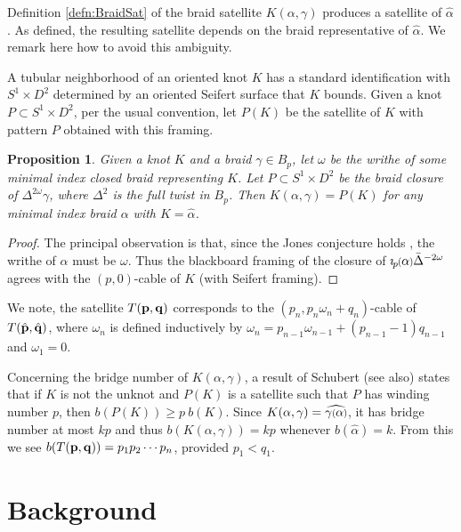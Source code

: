 \documentclass[11pt]{amsart}
\newcommand*{\smallp}[1]{\scalebox{.75}{\ensuremath#1}}
\newcommand{\pp}[2][p]{\imath_{\hspace*{-1pt}#1}\hspace*{-.5pt}\smallp(#2\smallp)}
\newtheorem{prop}[thm]{Proposition}
\theoremstyle{definition}
\begin{document}
Definition \ref{defn:BraidSat} of the braid satellite $K(\alpha,\gamma)$ produces a satellite of $\hat{\alpha}$. As defined, the resulting satellite depends on the braid representative of $\hat{\alpha}$. We remark here how to avoid this ambiguity.

A tubular neighborhood of an oriented knot $K$ has a standard identification with $S^1\times D^2$ determined by an oriented Seifert surface that $K$ bounds. Given a knot $P\subset S^1\times D^2$, per the usual convention, let $P(K)$ be the satellite of $K$ with pattern $P$ obtained with this framing.

\begin{prop}\label{PropAsSatelliteOp}Given a knot $K$ and a braid $\gamma\in B_p$, let $\omega$ be the writhe of some minimal index closed braid representing $K$. Let $P\subset S^1\times D^2$ be the braid closure of $\Delta^{2\omega}\gamma$, where $\Delta^2$ is the full twist in $B_p$. Then $K(\alpha,\gamma) = P(K)$ for any minimal index braid $\alpha$ with $K=\hat{\alpha}$.
\end{prop}
\begin{proof}The principal observation is that, since the Jones conjecture holds \cite{DP12,LM12}, the writhe of $\alpha$ must be $\omega$. Thus the blackboard framing of the closure of $\pp\alpha\bar\Delta^{-2\omega}$ agrees with the $(p,0)$-cable of $K$ (with Seifert framing).
\end{proof}

We note, the satellite $T({\bf p},{\bf q})$ corresponds to the $(p_n,p_n\omega_n+q_n)$-cable of $T(\hat{\bf p},\hat{\bf q})$, where $\omega_n$ is defined inductively by $\omega_n=p_{n-1}\omega_{n-1}+(p_{n-1}-1)q_{n-1}$ and $\omega_1=0$.

Concerning the bridge number of $K(\alpha,\gamma)$, a result of Schubert \cite{Schub} (see \cite{Schul} also) states that if $K$ is not the unknot and $P(K)$ is a satellite such that $P$ has winding number $p$, then $b(P(K)) \ge p\ b(K)$. Since $K(\alpha,\gamma) = \widehat{\gamma\smallp(\alpha\smallp)}$, it has bridge number at most $kp$ and thus $b(K(\alpha,\gamma)) = kp$ whenever $b(\hat\alpha) = k$. From this we see $b(T({\bf p},{\bf q})) = p_1p_2\cdots p_n$, provided $p_1 < q_1$.



\section{Background}
\label{SecBG}
\end{document}
